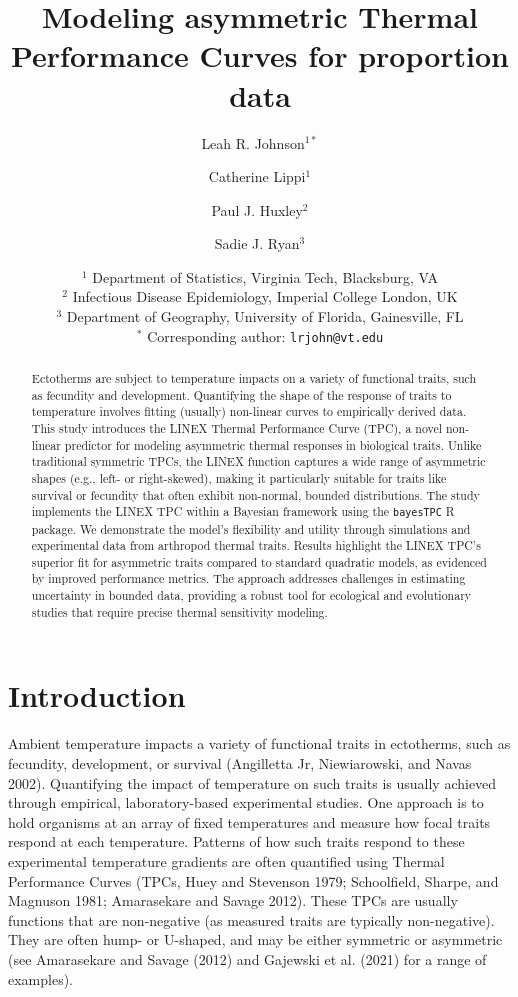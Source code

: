 \documentclass[
  12pt,
]{article}
\title{Modeling asymmetric Thermal Performance Curves for proportion
data}
\author{Leah R. Johnson$^{1*}$ \and Catherine Lippi$^{1}$ \and Paul J.
Huxley$^{2}$ \and Sadie J. Ryan$^{3}$}
\date{%
$^1$ Department of Statistics, Virginia Tech, Blacksburg, VA\\
$^2$ Infectious Disease Epidemiology, Imperial College London, UK\\
$^3$ Department of Geography, University of Florida, Gainesville, FL\\
$^*$ Corresponding author: \texttt{lrjohn@vt.edu} 
}
\begin{document}
\maketitle

\clearpage

\begin{abstract}
Ectotherms are subject to temperature impacts on a variety of functional
traits, such as fecundity and development. Quantifying the shape of the
response of traits to temperature involves fitting (usually) non-linear
curves to empirically derived data. This study introduces the LINEX
Thermal Performance Curve (TPC), a novel non-linear predictor for
modeling asymmetric thermal responses in biological traits. Unlike
traditional symmetric TPCs, the LINEX function captures a wide range of
asymmetric shapes (e.g., left- or right-skewed), making it particularly
suitable for traits like survival or fecundity that often exhibit
non-normal, bounded distributions. The study implements the LINEX TPC
within a Bayesian framework using the \texttt{bayesTPC} R package. We
demonstrate the model's flexibility and utility through simulations and
experimental data from arthropod thermal traits. Results highlight the
LINEX TPC's superior fit for asymmetric traits compared to standard
quadratic models, as evidenced by improved performance metrics. The
approach addresses challenges in estimating uncertainty in bounded data,
providing a robust tool for ecological and evolutionary studies that
require precise thermal sensitivity modeling.
\end{abstract}


\section{Introduction}\label{introduction}

Ambient temperature impacts a variety of functional traits in
ectotherms, such as fecundity, development, or survival (Angilletta Jr,
Niewiarowski, and Navas 2002). Quantifying the impact of temperature on
such traits is usually achieved through empirical, laboratory-based
experimental studies. One approach is to hold organisms at an array of
fixed temperatures and measure how focal traits respond at each
temperature. Patterns of how such traits respond to these experimental
temperature gradients are often quantified using Thermal Performance
Curves (TPCs, Huey and Stevenson 1979; Schoolfield, Sharpe, and Magnuson
1981; Amarasekare and Savage 2012). These TPCs are usually functions
that are non-negative (as measured traits are typically non-negative).
They are often hump- or U-shaped, and may be either symmetric or
asymmetric (see Amarasekare and Savage (2012) and Gajewski et al. (2021)
for a range of examples).
\end{document}
